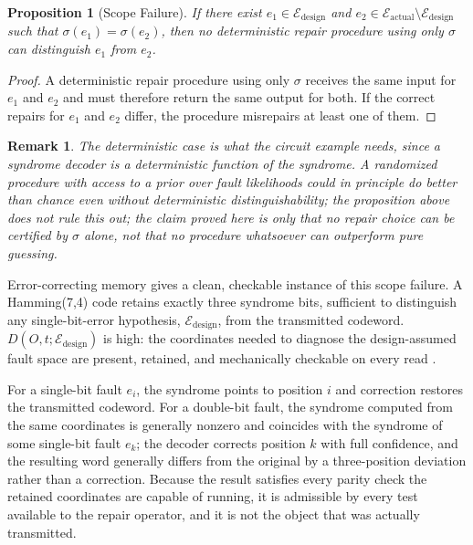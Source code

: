 \documentclass[11pt]{article}
\newtheorem{proposition}{Proposition}[section]
\newtheorem{remark}{Remark}[section]
\begin{document}
\begin{proposition}[Scope Failure]
If there exist $e_1 \in \mathcal{E}_{\text{design}}$ and $e_2 \in \mathcal{E}_{\text{actual}} \setminus \mathcal{E}_{\text{design}}$ such that $\sigma(e_1) = \sigma(e_2)$, then no deterministic repair procedure using only $\sigma$ can distinguish $e_1$ from $e_2$.
\end{proposition}

\begin{proof}
A deterministic repair procedure using only $\sigma$ receives the same input for $e_1$ and $e_2$ and must therefore return the same output for both. If the correct repairs for $e_1$ and $e_2$ differ, the procedure misrepairs at least one of them.
\end{proof}

\begin{remark}
The deterministic case is what the circuit example needs, since a syndrome decoder is a deterministic function of the syndrome. A randomized procedure with access to a prior over fault likelihoods could in principle do better than chance even without deterministic distinguishability; the proposition above does not rule this out; the claim proved here is only that no repair choice can be certified by $\sigma$ alone, not that no procedure whatsoever can outperform pure guessing.
\end{remark}

Error-correcting memory gives a clean, checkable instance of this scope failure. A Hamming(7,4) code retains exactly three syndrome bits, sufficient to distinguish any single-bit-error hypothesis, $\mathcal{E}_{\text{design}}$, from the transmitted codeword. $D(O,t;\mathcal{E}_{\text{design}})$ is high: the coordinates needed to diagnose the design-assumed fault space are present, retained, and mechanically checkable on every read \cite{circuitsbook}.

For a single-bit fault $e_i$, the syndrome points to position $i$ and correction restores the transmitted codeword. For a double-bit fault, the syndrome computed from the same coordinates is generally nonzero and coincides with the syndrome of some single-bit fault $e_k$; the decoder corrects position $k$ with full confidence, and the resulting word generally differs from the original by a three-position deviation rather than a correction. Because the result satisfies every parity check the retained coordinates are capable of running, it is admissible by every test available to the repair operator, and it is not the object that was actually transmitted.
\end{document}
